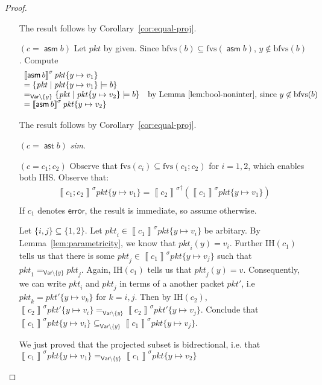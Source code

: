 \documentclass{article}
\newcommand{\pkt}{\mathit{pkt}}
\newcommand{\error}{\mathsf{error}}
\newcommand{\denote}[1]{\left\llbracket#1\right\rrbracket}
\newcommand{\Var}{\mathsf{Var}}
\newcommand{\assert}{\mathop{\mathsf{ast}}}
\newcommand{\assume}{\mathop{\mathsf{asm}}}
\newcommand{\fvs}{\textrm{fvs}}
\newcommand{\bfvs}{\textrm{bfvs}}
\theoremstyle{plain}
\theoremstyle{definition}
\theoremstyle{remark}
\begin{document}
\begin{proof}
\begin{enumerate}[align=left]
    The result follows by Corollary~\ref{cor:equal-proj}.

  \item[$(c = \assume b)$]
    Let $\pkt$ by given. Since $\bfvs(b) \subseteq \fvs(\assume b)$, $y \not\in \bfvs(b)$.
    Compute \[
    \begin{array}{ll}
      \denote{\assume b}^\sigma \pkt\{y \mapsto v_1\} \\
      = \{\pkt \mid \pkt\{y \mapsto v_1\} \models b\}\\
      =_{\Var \setminus \{y\}} \{\pkt \mid \pkt\{y \mapsto v_2\} \models b\} & \text{by Lemma~\ref{lem:bool-noninter}, since }y \not\in \bfvs(b) \\
      = \denote{\assume b}^\sigma \pkt\{y \mapsto v_2\}
    \end{array}
    \]

    The result follows by Corollary~\ref{cor:equal-proj}.

    \item[$(c = \assert b)$] \textit{sim}.
    \item[$(c = c_1;c_2)$] Observe that $\fvs(c_i) \subseteq \fvs(c_1;c_2)$ for
      $i = 1,2$, which enables both IHS. Observe that:
      \[\begin{array}{ll}
      \denote{c_1;c_2}^\sigma\pkt\{y \mapsto v_1\}
      = {\denote{c_2}^\sigma}^\dagger\left(\denote{c_1}^\sigma\pkt\{y\mapsto v_1\}\right) \\
      \end{array}
      \]
      If $c_1$ denotes $\error$, the result is immediate, so assume otherwise.

      Let $\{i,j\} \subseteq \{1,2\}$. Let $\pkt_i \in
      \denote{c_1}^\sigma\pkt\{y \mapsto v_i\}$ be arbitary. By
      Lemma~\ref{lem:parametricity}, we know that $\pkt_i(y) = v_i$. Further
      IH$(c_1)$ tells us that there is some $\pkt_j \in
      \denote{c_1}^\sigma\pkt\{y\mapsto v_j\}$ such that $\pkt_1 =_{\Var
        \setminus \{y\}} \pkt_j$. Again, IH$(c_1)$ tells us that $\pkt_j(y) =
      v$. Consequently, we can write $\pkt_i$ and $\pkt_j$ in terms of a another
      packet $\pkt'$, i.e $\pkt_k = \pkt'\{y \mapsto v_k\}$ for $k = i,j$. Then
      by IH$(c_2)$, $\denote{c_2}^\sigma\pkt'\{y \mapsto v_i\} =_{\Var \setminus \{y\}}
      \denote{c_2}^\sigma \pkt'\{y \mapsto v_j\}$. Conclude that
      $\denote{c_1}^\sigma\pkt\{y \mapsto v_i\} \subseteq_{\Var \setminus \{y\} }
      \denote{c_1}^\sigma\pkt\{y \mapsto v_j\}$.

      We just proved that the projected subset is bidrectional, i.e. that
      $\denote{c_1}^\sigma\pkt\{y \mapsto v_1\} =_{\Var \setminus\{y\}}
      \denote{c_1}^\sigma\pkt\{y \mapsto v_2\}$


\end{enumerate}
\end{proof}
\end{document}
